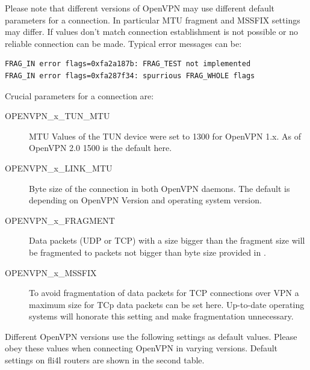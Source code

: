 Please note that different versions of OpenVPN may use different default 
parameters for a connection. In particular MTU fragment and MSSFIX 
settings may differ. If values \glqq{}don't match\grqq{} connection 
establishment is not possible or no reliable connection can be made. 
Typical error messages can be:

\begin{example}
\begin{verbatim}
FRAG_IN error flags=0xfa2a187b: FRAG_TEST not implemented
FRAG_IN error flags=0xfa287f34: spurrious FRAG_WHOLE flags
\end{verbatim}
\end{example}

Crucial parameters for a connection are:

\begin{description}

\item [OPENVPN\_x\_TUN\_MTU] MTU Values of the TUN device were set to 
  1300 for OpenVPN 1.x. As of OpenVPN 2.0 1500 is the default here.

\item [OPENVPN\_x\_LINK\_MTU] Byte size of the connection in both 
  OpenVPN daemons. The default is depending on OpenVPN Version and 
  operating system version.

\item [OPENVPN\_x\_FRAGMENT] Data packets (UDP or TCP) with a size 
  bigger than the fragment size will be fragmented to packets not 
  bigger than byte size provided in .

\item [OPENVPN\_x\_MSSFIX] To avoid fragmentation of data packets for 
  TCP connections over VPN a maximum size for TCp data packets can be 
  set here. Up-to-date operating systems will honorate this setting 
  and make fragmentation unnecessary.

\end{description}

Different OpenVPN versions use the following settings as default values. 
Please obey these values when connecting OpenVPN in varying versions.
Default settings on fli4l routers are shown in the second table.

